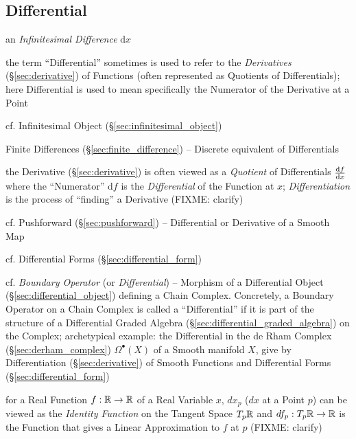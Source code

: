 \subsection{Differential}\label{sec:differential}

an \emph{Infinitesimal Difference} $\mathrm{d}x$

the term ``Differential'' sometimes is used to refer to the \emph{Derivatives}
(\S\ref{sec:derivative}) of Functions (often represented as Quotients of
Differentials); here Differential is used to mean specifically the Numerator of
the Derivative at a Point

\fist cf. Infinitesimal Object (\S\ref{sec:infinitesimal_object})

\fist Finite Differences (\S\ref{sec:finite_difference}) -- Discrete equivalent
of Differentials

\fist the Derivative (\S\ref{sec:derivative}) is often viewed as a
\emph{Quotient} of Differentials $\frac{\mathrm{d}f}{\mathrm{d}x}$ where the ``Numerator''
$\mathrm{d}f$ is the \emph{Differential} of the Function at $x$;
\emph{Differentiation} is the process of ``finding'' a Derivative (FIXME:
clarify)

\fist cf. Pushforward (\S\ref{sec:pushforward}) -- Differential or Derivative of
a Smooth Map

\fist cf. Differential Forms (\S\ref{sec:differential_form})

\fist cf. \emph{Boundary Operator} (or \emph{Differential}) -- Morphism of a
Differential Object (\S\ref{sec:differential_object}) defining a Chain Complex.
Concretely, a Boundary Operator on a Chain Complex is called a ``Differential''
if it is part of the structure of a Differential Graded Algebra
(\S\ref{sec:differential_graded_algebra}) on the Complex; archetypical example:
the Differential in the de Rham Complex (\S\ref{sec:derham_complex})
$\Omega^\bullet(X)$ of a Smooth manifold $X$, give by Differentiation
(\S\ref{sec:derivative}) of Smooth Functions and Differential Forms
(\S\ref{sec:differential_form})

for a Real Function $f : \mathbb{R} \rightarrow \mathbb{R}$ of a Real Variable $x$,
$dx_p$ ($dx$ at a Point $p$) can be viewed as the \emph{Identity Function} on
the Tangent Space $T_p\mathbb{R}$ and $df_p : T_p\mathbb{R} \rightarrow \mathbb{R}$ is the
Function that gives a Linear Approximation to $f$ at $p$ (FIXME: clarify)

